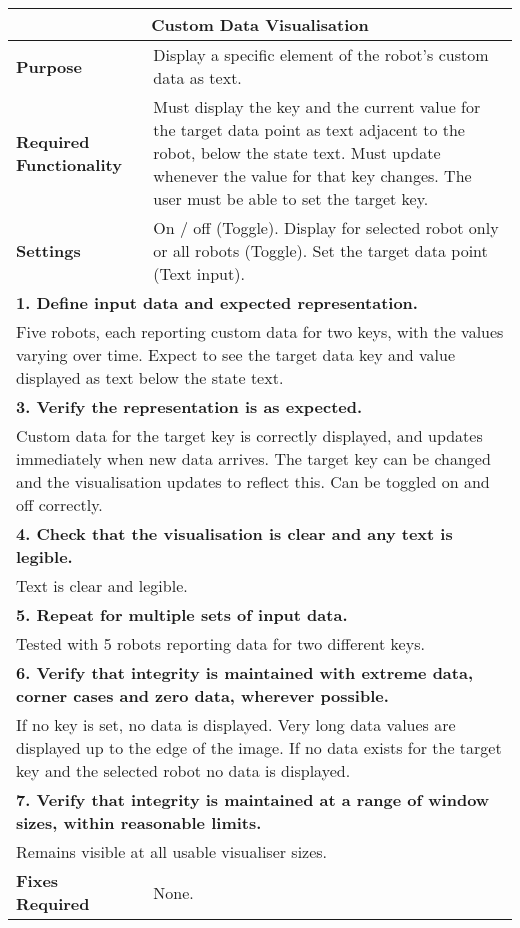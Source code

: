 \begin{longtable}{ l p{10cm} }
 \hline
 \multicolumn{2}{c}{\textbf{Custom Data Visualisation}}\\
 \hline
 \textbf{Purpose} & Display a specific element of the robot's custom data as text.\\
 \textbf{Required Functionality} & Must display the key and the current value for the target data point as text adjacent to the robot, below the state text. Must update whenever the value for that key changes. The user must be able to set the target key.\\
 \textbf{Settings} & On / off (Toggle). Display for selected robot only or all robots (Toggle). Set the target data point (Text input).\\
 \hline
 \multicolumn{2}{p{14cm}}{\textbf{1. Define input data and expected representation.}}\\
 \multicolumn{2}{p{14cm}}{Five robots, each reporting custom data for two keys, with the values varying over time. Expect to see the target data key and value displayed as text below the state text.}\\
 \hline
 \multicolumn{2}{p{14cm}}{\textbf{3. Verify the representation is as expected.}}\\
 \multicolumn{2}{p{14cm}}{Custom data for the target key is correctly displayed, and updates immediately when new data arrives. The target key can be changed and the visualisation updates to reflect this. Can be toggled on and off correctly.}\\
 \hline
 \multicolumn{2}{p{14cm}}{\textbf{4. Check that the visualisation is clear and any text is legible.}}\\
 \multicolumn{2}{p{14cm}}{Text is clear and legible.}\\
 \hline
 \multicolumn{2}{p{14cm}}{\textbf{5. Repeat for multiple sets of input data.}}\\
 \multicolumn{2}{p{14cm}}{Tested with 5 robots reporting data for two different keys.}\\
 \hline
 \multicolumn{2}{p{14cm}}{\textbf{6. Verify that integrity is maintained with extreme data, corner cases and zero data, wherever possible.}}\\
 \multicolumn{2}{p{14cm}}{If no key is set, no data is displayed. Very long data values are displayed up to the edge of the image. If no data exists for the target key and the selected robot no data is displayed.}\\
 \hline
 \multicolumn{2}{p{14cm}}{\textbf{7. Verify that integrity is maintained at a range of window sizes, within reasonable limits.}}\\
 \multicolumn{2}{p{14cm}}{Remains visible at all usable visualiser sizes.}\\
 \hline
 \textbf{Fixes Required} & None.\\
 \bottomrule
\end{longtable}
\clearpage

